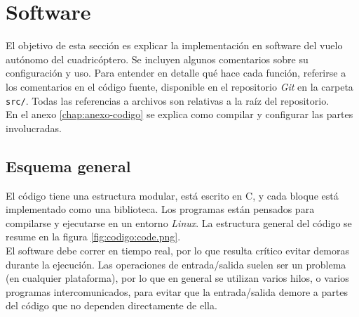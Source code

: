 \documentclass[main]{subfiles}
\begin{document}
\chapter{Software}
\label{chap:Software}

El objetivo de esta sección es explicar la implementaci\'on en software del vuelo autónomo del cuadricóptero. Se incluyen algunos comentarios sobre su configuraci\'on y uso. Para entender en detalle qué hace cada función, referirse a los comentarios en el código fuente, disponible en el repositorio \textit{Git} en la carpeta \verb+src/+. Todas las referencias a archivos son relativas a la raíz del repositorio.\\

En el anexo \ref{chap:anexo-codigo} se explica como compilar y configurar las partes involucradas.

\section{Esquema general}
\label{sec:software:esquema-general}

El código tiene una estructura modular, está escrito en C, y cada bloque está implementado como una biblioteca. Los programas están pensados para compilarse y ejecutarse en un entorno \emph{Linux}. La estructura general del código se resume en la figura \ref{fig:codigo:code.png}.\\

El software debe correr en tiempo real, por lo que resulta cr\'itico evitar demoras durante la ejecuci\'on. Las operaciones de entrada/salida suelen ser un problema (en cualquier plataforma), por lo que en general se utilizan varios hilos, o varios programas intercomunicados, para evitar que la entrada/salida demore a partes del c\'odigo que no dependen directamente de ella.\\
\end{document}
